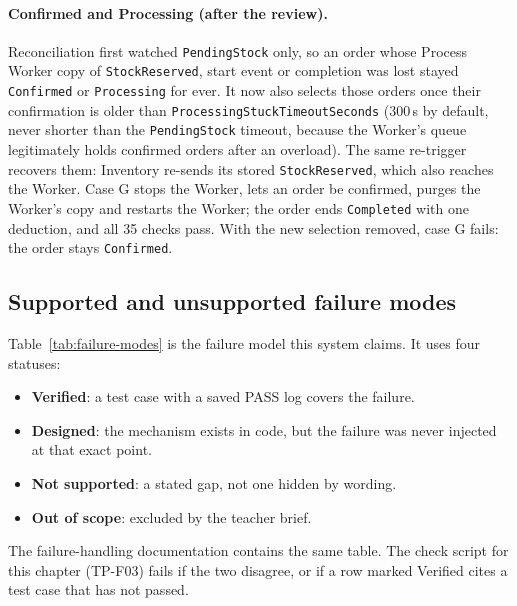 \documentclass[a4paper]{report}
\begin{document}
\paragraph{Confirmed and Processing (after the review).} Reconciliation first
watched \texttt{PendingStock} only, so an order whose Process Worker copy of
\texttt{StockReserved}, start event or completion was lost stayed
\texttt{Confirmed} or \texttt{Processing} for ever. It now also selects those
orders once their confirmation is older than
\texttt{Processing\allowbreak Stuck\allowbreak Timeout\allowbreak Seconds} (300\,s by default, never shorter than
the \texttt{PendingStock} timeout, because the Worker's queue legitimately
holds confirmed orders after an overload). The same re-trigger recovers them:
Inventory re-sends its stored \texttt{StockReserved}, which also reaches the
Worker. Case G stops the Worker, lets an order be confirmed, purges the
Worker's copy and restarts the Worker; the order ends \texttt{Completed} with
one deduction, and all 35 checks pass. With the new selection removed, case G
fails: the order stays \texttt{Confirmed}.

\subsection{Supported and unsupported failure modes}

Table~\ref{tab:failure-modes} is the failure model this system claims. It uses
four statuses:
\begin{itemize}
  \item \textbf{Verified}: a test case with a saved PASS log covers the
    failure.
  \item \textbf{Designed}: the mechanism exists in code, but the failure was
    never injected at that exact point.
  \item \textbf{Not supported}: a stated gap, not one hidden by wording.
  \item \textbf{Out of scope}: excluded by the teacher brief.
\end{itemize}
The failure-handling documentation contains the same table. The check
script for this chapter (TP-F03) fails if the two disagree, or if a row
marked Verified cites a test case that has not passed.
\end{document}
